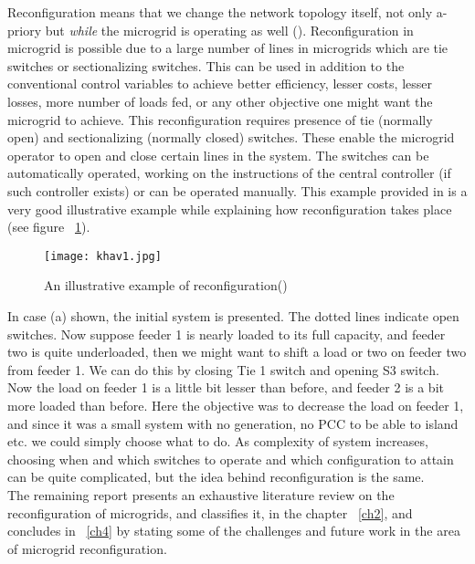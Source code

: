 Reconfiguration means that we change the network topology itself, not only a-priory but \textit{while} the microgrid is operating as well (\citep{mgrrev01}). Reconfiguration in microgrid is possible due to a large number of lines in microgrids which are tie switches or sectionalizing switches. This can be used in addition to the conventional control variables to achieve better efficiency, lesser costs, lesser losses, more number of loads fed, or any other objective one might want the microgrid to achieve.
This reconfiguration requires presence of tie (normally open) and sectionalizing (normally closed) switches. These enable the microgrid operator to open and close certain lines in the system. The switches can be automatically operated, working on the instructions of the central controller (if such controller exists) or can be operated manually.
This example provided in \citep{mgrj18} is a very good illustrative example while explaining how reconfiguration takes place (see figure ~\ref{fig:khav1}).
\begin{figure}[tbp]
  \centering
    \texttt{[image: khav1.jpg]}%
    \caption[Reconfiguration]{An illustrative example of reconfiguration(\citep{mgrj18})}
    \label{fig:khav1} 
\end{figure}
In case (a) shown, the initial system is presented. The dotted lines indicate open switches. Now suppose feeder 1 is nearly loaded to its full capacity, and feeder two is quite underloaded, then we might want to shift a load or two on feeder two from feeder 1. We can do this by closing Tie 1 switch and opening S3 switch. Now the load on feeder 1 is a little bit lesser than before, and feeder 2 is a bit more loaded than before. Here the objective was to decrease the load on feeder 1, and since it was a small system with no generation, no PCC to be able to island etc. we could simply choose what to do. As complexity of system increases, choosing when and which switches to operate and which configuration to attain can be quite complicated, but the idea behind reconfiguration is the same.\\
The remaining report presents an exhaustive literature review on the reconfiguration of microgrids, and classifies it, in the chapter ~\ref{ch2}, and concludes in ~\ref{ch4} by stating some of the challenges and future work in the area of microgrid reconfiguration.



